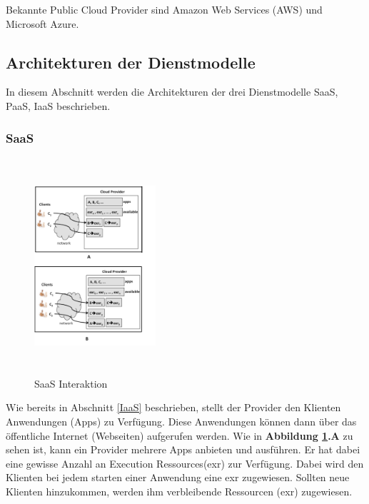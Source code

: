 Bekannte Public Cloud Provider sind Amazon Web Services (AWS) und Microsoft Azure. 


\subsection{Architekturen der Dienstmodelle}

In diesem Abschnitt werden die Architekturen der drei Dienstmodelle SaaS, PaaS, IaaS beschrieben.

\subsubsection{SaaS}\label{SaaS Architektur}

\begin{figure}[H]
    \centering
	\includegraphics[width=0.4\textwidth, height=8cm]{Images/SaaSInteraction}
	\caption{SaaS Interaktion \cite{Badger}}
	\label{SaaSInteraction}
\end{figure}
Wie bereits in Abschnitt \ref{IaaS} beschrieben, stellt der Provider den Klienten Anwendungen (\glqq Apps\grqq) zu Verfügung.
Diese Anwendungen können dann über das öffentliche Internet (Webseiten) aufgerufen werden.
Wie in \textbf{Abbildung \ref{SaaSInteraction}.A} zu sehen ist, kann ein Provider mehrere Apps anbieten und ausführen.
Er hat dabei eine gewisse Anzahl an \glqq Execution Ressources\grqq (exr) zur Verfügung. 
Dabei wird den Klienten bei jedem starten einer Anwendung eine exr zugewiesen. Sollten neue Klienten hinzukommen, werden ihm verbleibende Ressourcen (exr) zugewiesen. 

